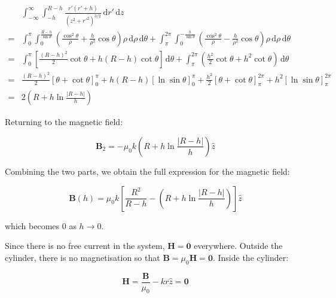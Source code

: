 \documentclass[12pt]{article}
\begin{document}
\begin{equation}
    \begin{split}
        &\int_{-\infty}^{\infty} \int_{-h}^{R-h} \frac{r'(r'+h)}{(z^{2} + r'^{2})^{3/2}} \, \mathrm{d}r' \, \mathrm{d}z \\
        = &\int_{0}^{\pi} \int_{0}^{\frac{R-h}{\sin{\theta}}} \left( \frac{\cos^{2}{\theta}}{\rho} + \frac{h}{\rho^{2}} \cos{\theta} \right) \rho \, \mathrm{d}\rho \, \mathrm{d}\theta + \int_{\pi}^{2\pi} \int_{0}^{-\frac{h}{\sin{\theta}}} \left( \frac{\cos^{2}{\theta}}{\rho} - \frac{h}{\rho^{2}} \cos{\theta} \right) \rho \, \mathrm{d}\rho \, \mathrm{d}\theta \\
        = &\int_{0}^{\pi} \left[ \frac{(R-h)^{2}}{2} \cot{\theta} + h(R - h) \cot{\theta} \right] \, \mathrm{d}\theta + \int_{\pi}^{2\pi} \left( \frac{h^{2}}{2} \cot{\theta} + h^{2} \cot{\theta} \right) \, \mathrm{d}\theta \\
        = &\frac{(R-h)^{2}}{2} \left[ \theta + \cot{\theta} \right]_{0}^{\pi} + h(R - h) \left[ \ln{\sin{\theta}} \right]_{0}^{\pi} + \frac{h^{2}}{2} \left[ \theta + \cot{\theta} \right]_{\pi}^{2\pi} + h^{2} \left[ \ln{\sin{\theta}} \right]_{\pi}^{2\pi} \\
        = &2\left( R + h \ln{\frac{\left\lvert R-h \right\rvert}{h}} \right)
    \end{split}
\end{equation}

Returning to the magnetic field:

\begin{equation}
    \mathbf{B}_{2} = -\mu_{0}k \left( R + h \ln{\frac{\left\lvert R-h \right\rvert}{h}} \right) \hat{z}
\end{equation}

Combining the two parts, we obtain the full expression for the magnetic field:

\begin{equation}
    \mathbf{B}(h) = \mu_{0}k \left[ \frac{R^{2}}{R-h} - \left( R + h \ln{\frac{\left\lvert R-h \right\rvert}{h}} \right) \right] \hat{z}
\end{equation}

which becomes $0$ as $h \to 0$.

Since there is no free current in the system, $\mathbf{H} = \mathbf{0}$ everywhere. Outside the cylinder, there is no magnetisation so that $\mathbf{B} = \mu_{0} \mathbf{H} = \mathbf{0}$. Inside the cylinder:

\begin{equation}
    \mathbf{H} = \frac{\mathbf{B}}{\mu_{0}} - kr \hat{z} = \mathbf{0}
\end{equation}
\end{document}

